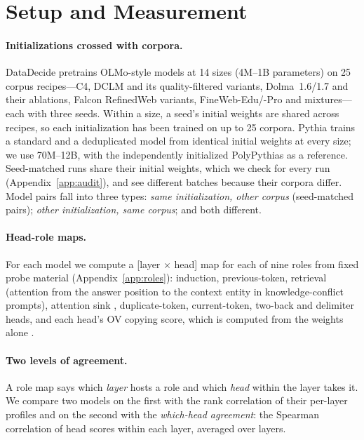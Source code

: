 \documentclass[11pt]{article}
\begin{document}
\section{Setup and Measurement}
\label{sec:setup}

\paragraph{Initializations crossed with corpora.}
DataDecide pretrains OLMo-style models at 14 sizes (4M--1B parameters) on 25 corpus recipes---C4, DCLM and its quality-filtered variants, Dolma~1.6/1.7 and their ablations, Falcon RefinedWeb variants, FineWeb-Edu/-Pro and mixtures---each with three seeds.
Within a size, a seed's initial weights are shared across recipes, so each initialization has been trained on up to 25 corpora.
Pythia trains a standard and a deduplicated model from identical initial weights at every size; we use 70M--12B, with the independently initialized PolyPythias \citep{vanderwal2025polypythias} as a reference.
Seed-matched runs share their initial weights, which we check for every run (Appendix~\ref{app:audit}), and see different batches because their corpora differ.
Model pairs fall into three types: \emph{same initialization, other corpus} (seed-matched pairs); \emph{other initialization, same corpus}; and both different.

\paragraph{Head-role maps.}
For each model we compute a [layer $\times$ head] map for each of nine roles from fixed probe material (Appendix~\ref{app:roles}): induction, previous-token, retrieval (attention from the answer position to the context entity in knowledge-conflict prompts), attention sink \citep{xiao2024efficient}, duplicate-token, current-token, two-back and delimiter heads, and each head's OV copying score, which is computed from the weights alone \citep{elhage2021mathematical}.

\paragraph{Two levels of agreement.}
A role map says which \emph{layer} hosts a role and which \emph{head} within the layer takes it.
We compare two models on the first with the rank correlation of their per-layer profiles and on the second with the \emph{which-head agreement}: the Spearman correlation of head scores within each layer, averaged over layers.
\end{document}
